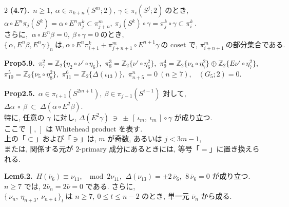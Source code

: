 \documentclass[10pt, leqno]{ltjsarticle}
\newcommand{\todai}[2][]{\{\,#2\,\}_{#1}}      %
\newcommand{\gen}[1]{\{#1\}}       %
\newcommand{\pis}[2]{\pi_{#1}(#2)}       %
\newcommand{\pit}[2]{\pi_{#1}^{#2}}
\numberwithin{equation}{section}
\theoremstyle{plain}
\theoremstyle{definition}
\theoremstyle{remark}
\begin{document}
\begin{paracol}{2}
\noindent
\textbf{(4.7).}\
\(n\ge1, \ \alpha\in\pis{k+n}{S^m; 2},\ \gamma\in\pis{i}{S^j; 2}
\ \text{のとき, }\)\\
\(\alpha\circ E^n\pis{j}{S^k} = \alpha\circ E^n \pit{j}{k}
\subset \pit{j+n}{m},
\ \pis{j}{S^k}\circ\gamma = \pit{j}{k}\circ\gamma \subset\pit{i}{k}\ . \)\\
\(\text{さらに, }\ \alpha\circ E^n\beta=0,\ \beta\circ\gamma = 0 \ \text{のとき, }\)\\
\(\todai[n]{\alpha, E^n\beta, E^n\gamma}\ \text{は,}\
\alpha\circ E^n\pit{i+1}{k} + \pit{j+n+1}{m}\circ E^{n+1}\gamma\
\text{の coset で, }\pit{i+n+1}{m} \ \text{の部分集合である. }\)

\noindent
\textbf{Prop5.9.}\
\(\pi^{2}_{7}=\mathbb Z_2\gen{\eta_{2}\circ\nu'\circ\eta_6},\) \quad
\(\pi^{3}_{8}=\mathbb Z_2\gen{\nu'\circ\eta_6^2},\) \quad
\(\pi^{4}_{9}=\mathbb Z_2\gen{\nu_{4}\circ\eta_7^2}\oplus \mathbb Z_2\gen{E\nu'\circ\eta_7^2},\) \\
\(\pi^{5}_{10}=\mathbb Z_2\gen{\nu_{5}\circ\eta_8^2},\) \quad
\(\pi^{6}_{11}=\mathbb Z_2\gen{\Delta(\iota_{13})},\) \quad
\(\pi^{n}_{n+5}=0\ (n\ge7),\) \
\((G_{5};2)=0.\)

\noindent
\textbf{Prop2.5.}\
$\alpha\in\pi_{i+1}(S^{2m+1}), \ \beta\in \pi_{j-1}(S^{i-1})$ 対して, 
\(
\Delta\alpha\ \circ\ \beta\ \subset\ \Delta(\alpha\circ E^2\beta).
\)\\
特に, 任意の $\gamma$ に対し,
\(
\Delta(E^2\gamma)\ \ni\ \pm\,[\,\iota_m,\ \iota_m\,]\circ\gamma
\)
が成り立つ. \\
ここで $[\, ,\,]$ は Whitehead product を表す. \\
上の「$\subset$」および「$\ni$」は, $m$ が奇数, 
あるいは $j<3m-1$, \\
または, 関係する元が \(2\)-primary 成分にあるときには, 
等号「$=$」に置き換えられる. 

\noindent
\textbf{Lem6.2.}\
\(H(\overline{\nu}_6)\equiv\nu_{11},\ \mod 2\nu_{11}\text{}\), 
\(\ \Delta(\nu_{13})=\pm 2\,\overline{\nu}_6\), 
\(\ 8\,\overline{\nu}_6=0\) が成り立つ. \\
\(n\ge7\) では,
\(2\overline{\nu}_n=2\overline{\nu}=0\) である. さらに,\\
\(
\todai[t]{\nu_n,\ \eta_{n+3},\ \nu_{n+4}}\ \text{は }n\ge7,\ 
0\le t\le n-2\text{ のとき, 単一元 }\overline{\nu}_n\text{ から成る. }
\)





\end{paracol}
\end{document}
